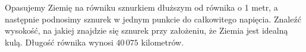 \begin{problem}
    Opasujemy Ziemię na równiku sznurkiem dłuższym od równika o 1 metr, a następnie podnosimy sznurek w jednym punkcie do całkowitego napięcia.
    Znaleźć wysokość, na jakiej znajdzie się sznurek przy założeniu, że Ziemia jest idealną kulą.
    Długość równika wynosi $40\,075$ kilometrów.
\end{problem}